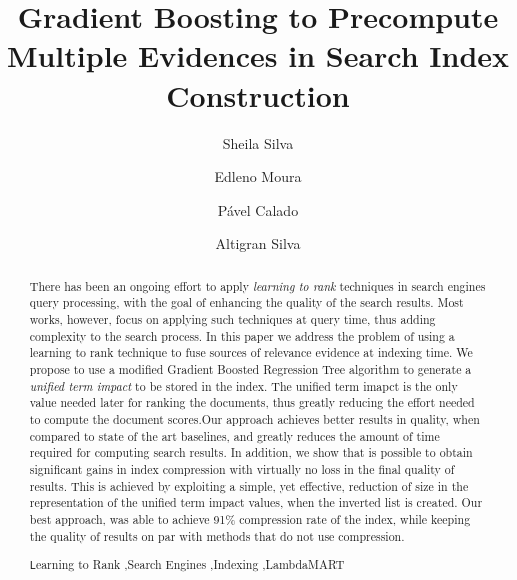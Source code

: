 \documentclass[preprint,12pt,3p]{elsarticle}
\begin{document}
\begin{frontmatter}



\title{Gradient Boosting to Precompute Multiple Evidences in Search Index Construction}

\author[mymainaddress]{Sheila Silva}
\author[mymainaddress]{Edleno Moura}
\author[mysecondaryaddress]{P{\'a}vel Calado}
\author[mymainaddress]{Altigran Silva}

\address[mymainaddress]{Universidade Federal do Amazonas, Brasil}
\address[mysecondaryaddress]{INESC-ID, Instituto Superior Técnico, Universidade de Lisboa}


\begin{abstract}

There has been an ongoing effort to apply \textit{learning to rank} techniques in search engines query processing, with the goal of enhancing the quality of the search results. Most works, however, focus on applying such techniques at query time, thus adding complexity to the search process. In this paper we address the problem of using a learning to rank technique to fuse sources of relevance evidence at indexing time. We propose to use a modified Gradient Boosted Regression Tree algorithm to generate a \textit{unified term impact} to be stored in the index. The unified term imapct is the only value needed later for ranking the documents, thus greatly reducing the effort needed to compute the document scores.Our approach achieves better results in quality, when compared to state of the art baselines, and greatly reduces the amount of time required for computing search results. In addition, we show that is possible to obtain significant gains in index compression with virtually no loss in the final quality of results. This is achieved by exploiting a simple, yet effective, reduction of size in the representation of the unified term impact values, when the inverted list is created. Our best approach, was able to achieve 91\% compression rate of the index, while keeping the quality of results on par with methods that do not use compression.


\begin{keyword}
\texttt Learning to Rank \sep Search Engines \sep Indexing \sep LambdaMART
\end{keyword}

\end{abstract}
\end{frontmatter}
\end{document}
